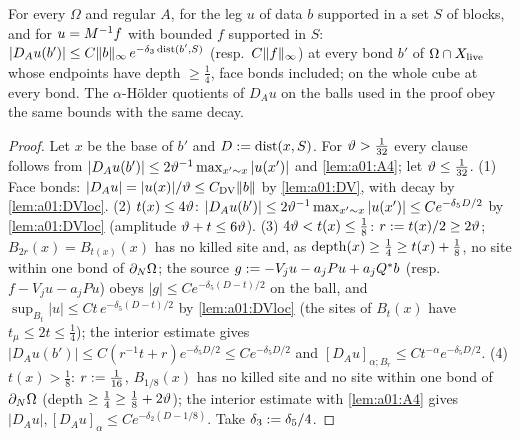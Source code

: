 \begin{lemma}\label{lem:a01:A5}
For every $\Omega$ and regular $A$, for the leg $u$ of data $b$ supported in a set $S$ of blocks, and for $u=M^{-1}f$ with bounded $f$ supported in $S$: $|D_Au(b')|\le C\lVert b\rVert_\infty\,e^{-\delta_3\operatorname{dist}(b',S)}$ (resp.\ $C\lVert f\rVert_\infty$) at every bond $b'$ of $\Omega\cap X_{\mathrm{live}}$ whose endpoints have depth $\ge\frac14$, face bonds included; on the whole cube at every bond. The $\alpha$-H\"older quotients of $D_Au$ on the balls used in the proof obey the same bounds with the same decay.
\end{lemma}
\begin{proof}
Let $x$ be the base of $b'$ and $D:=\operatorname{dist}(x,S)$. For $\vartheta>\frac1{32}$ every clause follows from $|D_Au(b')|\le2\vartheta^{-1}\max_{x'\sim x}|u(x')|$ and \cref{lem:a01:A4}; let $\vartheta\le\frac1{32}$. (1) Face bonds: $|D_Au|=|u(x)|/\vartheta\le C_{\mathrm{DV}}\lVert b\rVert$ by \cref{lem:a01:DV}, with decay by \cref{lem:a01:DVloc}. (2) $t(x)\le4\vartheta$: $|D_Au(b')|\le2\vartheta^{-1}\max_{x'\sim x}|u(x')|\le Ce^{-\delta_5D/2}$ by \cref{lem:a01:DVloc} (amplitude $\vartheta+t\le6\vartheta$). (3) $4\vartheta<t(x)\le\frac18$: $r:= t(x)/2\ge2\vartheta$; $B_{2r}(x)=B_{t(x)}(x)$ has no killed site and, as $\operatorname{depth}(x)\ge\frac14\ge t(x)+\frac18$, no site within one bond of $\partial_{N}\Omega$; the source $g:=-V_ju-a_jPu+a_jQ^*b$ (resp.\ $f-V_ju-a_jPu$) obeys $|g|\le Ce^{-\delta_5(D-t)/2}$ on the ball, and $\sup_{B_t}|u|\le Ct\,e^{-\delta_5(D-t)/2}$ by \cref{lem:a01:DVloc} (the sites of $B_t(x)$ have $t_\mu\le2t\le\frac14$); the interior estimate gives $|D_Au(b')|\le C(r^{-1}t+r)e^{-\delta_5D/2}\le Ce^{-\delta_5D/2}$ and $[D_Au]_{\alpha;B_r}\le Ct^{-\alpha}e^{-\delta_5D/2}$. (4) $t(x)>\frac18$: $r:=\frac1{16}$, $B_{1/8}(x)$ has no killed site and no site within one bond of $\partial_{N}\Omega$ (depth $\ge\frac14\ge\frac18+2\vartheta$); the interior estimate with \cref{lem:a01:A4} gives $|D_Au|,[D_Au]_\alpha\le Ce^{-\delta_2(D-1/8)}$. Take $\delta_3:=\delta_5/4$.
\end{proof}

